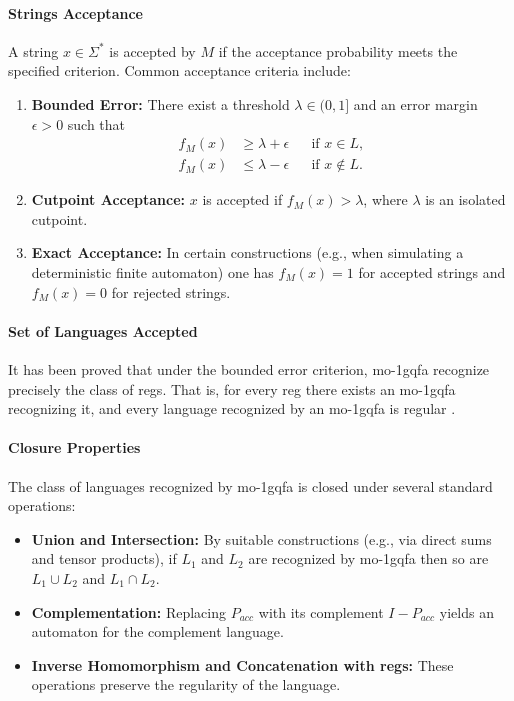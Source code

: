 \paragraph{Strings Acceptance} 
A string $x\in\Sigma^*$ is accepted by $M$ if the acceptance probability meets the specified criterion. Common acceptance criteria include:
\begin{enumerate}
  \item \textbf{Bounded Error:} There exist a threshold $\lambda\in(0,1]$ and an error margin $\epsilon>0$ such that
  \[
  \begin{aligned}
  f_M(x) &\ge \lambda+\epsilon &&\text{if } x\in L,\\[1mm]
  f_M(x) &\le \lambda-\epsilon &&\text{if } x\notin L.
  \end{aligned}
  \]
  \item \textbf{Cutpoint Acceptance:} $x$ is accepted if $f_M(x)>\lambda$, where $\lambda$ is an isolated cutpoint.
  \item \textbf{Exact Acceptance:} In certain constructions (e.g., when simulating a deterministic finite automaton) one has $f_M(x)=1$ for accepted strings and $f_M(x)=0$ for rejected strings.
\end{enumerate}

\paragraph{Set of Languages Accepted}  
It has been proved that under the bounded error criterion, \gls{mo-1gqfa} recognize precisely the class of \glspl{reg}. That is, for every \gls{reg} there exists an \gls{mo-1gqfa} recognizing it, and every language recognized by an \gls{mo-1gqfa} is regular \cite{li2012characterizations}.

\paragraph{Closure Properties}  
The class of languages recognized by \gls{mo-1gqfa} is closed under several standard operations:
\begin{itemize}
  \item \textbf{Union and Intersection:} By suitable constructions (e.g., via direct sums and tensor products), if $L_1$ and $L_2$ are recognized by \gls{mo-1gqfa} then so are $L_1\cup L_2$ and $L_1\cap L_2$.
  \item \textbf{Complementation:} Replacing $P_{acc}$ with its complement $I-P_{acc}$ yields an automaton for the complement language.
  \item \textbf{Inverse Homomorphism and Concatenation with \glspl{reg}:} These operations preserve the regularity of the language.
\end{itemize}

